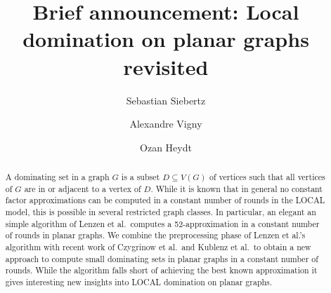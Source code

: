 \documentclass[a4paper,UKenglish,thm-restate,numberwithinsect]{lipics-v2021}
\title{Brief announcement: Local domination on planar graphs revisited} %
\author{Sebastian Siebertz}{University of Bremen, Germany}{siebertz@uni-bremen.de}{https://orcid.org/0000-0002-6347-1198}{}
\author{Alexandre Vigny}{University of Bremen, Germany}{vigny@uni-bremen.de}{https://orcid.org/0000-0002-4298-8876}{}
\author{Ozan Heydt}{University of Bremen, Germany}{heydt@uni-bremen.de}{}{}
\begin{document}
\maketitle

\begin{abstract}
A dominating set in a graph $G$ is a subset $D\subseteq V(G)$ of vertices
such that all vertices of $G$ are in or adjacent to a vertex of $D$.
While it is known that in general no constant factor approximations
can be computed in a constant number of rounds in the LOCAL model,
this is possible in several restricted graph classes. In particular,
an elegant an simple algorithm of Lenzen et al.\ computes a
52-approximation in a constant number of rounds in planar graphs.
We combine the preprocessing phase of Lenzen et al.'s algorithm
with recent work of Czygrinow et al.\ and Kublenz et al.\ to obtain a
new approach to compute small dominating sets in planar graphs
in a constant number of rounds. While the algorithm falls short
of achieving the best known approximation it gives interesting
new insights into LOCAL domination on planar graphs.
\end{abstract}
\end{document}
